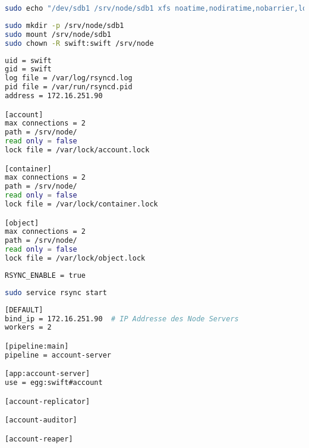 \begin{lstlisting}[label=mountconfig, language=Bash, caption=Mount Konfiguration anlegen ]
sudo echo "/dev/sdb1 /srv/node/sdb1 xfs noatime,nodiratime,nobarrier,logbufs=8 0 0" >> /etc/fstab
\end{lstlisting}

\begin{lstlisting}[label=MountPointDisk, language=Bash, caption=Mount Anlegen]
sudo mkdir -p /srv/node/sdb1
sudo mount /srv/node/sdb1
sudo chown -R swift:swift /srv/node
\end{lstlisting}

\begin{lstlisting}[label=rsyncConf, language=Bash, caption=Rsyncd in /etc/rsyncd.conf konfigurieren]
uid = swift
gid = swift
log file = /var/log/rsyncd.log
pid file = /var/run/rsyncd.pid
address = 172.16.251.90 

[account]
max connections = 2
path = /srv/node/
read only = false
lock file = /var/lock/account.lock

[container]
max connections = 2
path = /srv/node/
read only = false
lock file = /var/lock/container.lock

[object]
max connections = 2
path = /srv/node/
read only = false
lock file = /var/lock/object.lock
\end{lstlisting}

\begin{lstlisting}[label=configRsyncDefault, language=Bash, caption=Rsync Aktivieren in /etc/default/rsync]
RSYNC_ENABLE = true
\end{lstlisting}

\begin{lstlisting}[label=startRsynx, language=Bash, caption=Rsync Starten]
sudo service rsync start
\end{lstlisting}

\begin{lstlisting}[label=account-server.conf, language=Bash, caption=Account Server in /etc/swift/account-server.conf konfigurieren]
[DEFAULT]
bind_ip = 172.16.251.90  # IP Addresse des Node Servers
workers = 2

[pipeline:main]
pipeline = account-server

[app:account-server]
use = egg:swift#account

[account-replicator]

[account-auditor]

[account-reaper]
\end{lstlisting}



